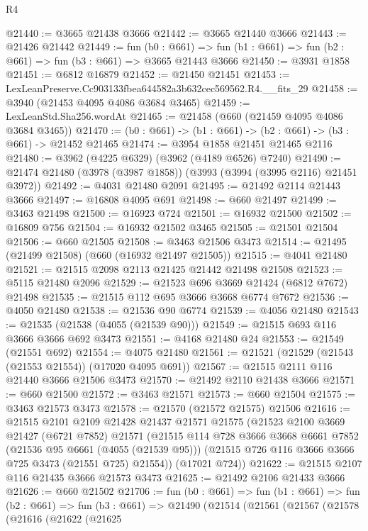 \begin{lexlean}{R4}
\begin{coremodule}
@21440 := @3665 @21438 @3666
@21442 := @3665 @21440 @3666
@21443 := @21426 @21442
@21449 := fun (b0 : @661) =>
  fun (b1 : @661) => fun (b2 : @661) => fun (b3 : @661) => @3665 @21443 @3666
@21450 := @3931 @1858
@21451 := @6812 @16879
@21452 := @21450 @21451
@21453 := LexLeanPreserve.Cc903133fbea644582a3b632cec569562.R4.__fits_29
@21458 := @3940 (@21453 @4095 @4086 @3684 @3465)
@21459 := LexLeanStd.Sha256.wordAt
@21465 := @21458 (@660 (@21459 @4095 @4086 @3684 @3465))
@21470 := (b0 : @661) -> (b1 : @661) -> (b2 : @661) -> (b3 : @661) -> @21452 @21465
@21474 := @3954 @1858 @21451 @21465 @2116
@21480 := @3962 (@4225 @6329) (@3962 (@4189 @6526) @7240)
@21490 := @21474 @21480 (@3978 (@3987 @1858)) (@3993 (@3994 (@3995 @2116) @21451 @3972))
@21492 := @4031 @21480 @2091
@21495 := @21492 @2114 @21443 @3666
@21497 := @16808 @4095 @691
@21498 := @660 @21497
@21499 := @3463 @21498
@21500 := @16923 @724
@21501 := @16932 @21500
@21502 := @16809 @756
@21504 := @16932 @21502 @3465
@21505 := @21501 @21504
@21506 := @660 @21505
@21508 := @3463 @21506 @3473
@21514 := @21495 (@21499 @21508) (@660 (@16932 @21497 @21505))
@21515 := @4041 @21480
@21521 := @21515 @2098 @2113 @21425 @21442 @21498 @21508
@21523 := @5115 @21480 @2096
@21529 := @21523 @696 @3669 @21424 (@6812 @7672) @21498
@21535 := @21515 @112 @695 @3666 @3668 @6774 @7672
@21536 := @4050 @21480
@21538 := @21536 @90 @6774
@21539 := @4056 @21480
@21543 := @21535 (@21538 (@4055 (@21539 @90)))
@21549 := @21515 @693 @116 @3666 @3666 @692 @3473
@21551 := @4168 @21480 @24
@21553 := @21549 (@21551 @692)
@21554 := @4075 @21480
@21561 := @21521 (@21529 (@21543 (@21553 @21554)) (@17020 @4095 @691))
@21567 := @21515 @2111 @116 @21440 @3666 @21506 @3473
@21570 := @21492 @2110 @21438 @3666
@21571 := @660 @21500
@21572 := @3463 @21571
@21573 := @660 @21504
@21575 := @3463 @21573 @3473
@21578 := @21570 (@21572 @21575) @21506
@21616 := @21515
    @2101
    @2109
    @21428
    @21437
    @21571
    @21575
    (@21523
      @2100
      @3669
      @21427
      (@6721 @7852)
      @21571
      (@21515
        @114
        @728
        @3666
        @3668
        @6661
        @7852
        (@21536 @95 @6661 (@4055 (@21539 @95)))
        (@21515 @726 @116 @3666 @3666 @725 @3473 (@21551 @725) @21554))
      (@17021 @724))
@21622 := @21515 @2107 @116 @21435 @3666 @21573 @3473
@21625 := @21492 @2106 @21433 @3666
@21626 := @660 @21502
@21706 := fun (b0 : @661) =>
  fun (b1 : @661) =>
  fun (b2 : @661) =>
  fun (b3 : @661) =>
  @21490
    (@21514
      (@21561
        (@21567
          (@21578
            (@21616
              (@21622
                (@21625

\end{coremodule}
\end{lexlean}
